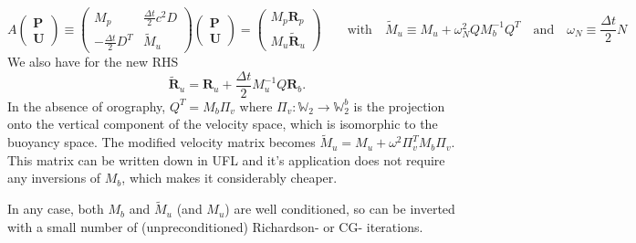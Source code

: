 \documentclass[10pt]{article}
\newcommand{\Wspace}{\mathbb{W}}
\renewcommand{\vec}[1]{\boldsymbol{#1}}
\begin{document}
\begin{equation}
  A\begin{pmatrix}\vec{P}\\[1ex]\vec{U}\end{pmatrix}
  \equiv
  \begin{pmatrix}
   M_p & \frac{\Delta t}{2}c^2 D \\[1ex]
   -\frac{\Delta t}{2}D^T & \tilde{M}_u
  \end{pmatrix}
  \begin{pmatrix}\vec{P}\\[1ex]\vec{U}\end{pmatrix}
 =
\begin{pmatrix}M_p\vec{R}_p\\[1ex]M_u\tilde{\vec{R}}_u\end{pmatrix}
\qquad\text{with}\quad 
\tilde{M}_u \equiv M_u + \omega^2_N QM_b^{-1}Q^T
\quad\text{and}\quad \omega_N \equiv \frac{\Delta t}{2}N\label{eqn:PressureVelocitySystem}
\end{equation}
We also have for the new RHS
\begin{equation}
  \tilde{\vec{R}}_u = \vec{R}_u+\frac{\Delta t}{2}M_u^{-1}Q\vec{R}_b.
  \label{eqn:BuoyancyRHS}
\end{equation}
In the absence of orography, $Q^T=M_b\Pi_v$ where $\Pi_v:\Wspace_2\rightarrow \Wspace_2^b$ is the projection onto the vertical component of the velocity space, which is isomorphic to the buoyancy space. The modified velocity matrix becomes $\tilde{M}_u = M_u + \omega^2 \Pi_v^T M_b \Pi_v$. This matrix can be written down in UFL and it's application does not require any inversions of $M_b$, which makes it considerably cheaper.

In any case, both $M_b$ and $\tilde{M}_u$ (and $M_u$) are well conditioned, so can be inverted with a small number of (unpreconditioned) Richardson- or CG- iterations.
\end{document}
